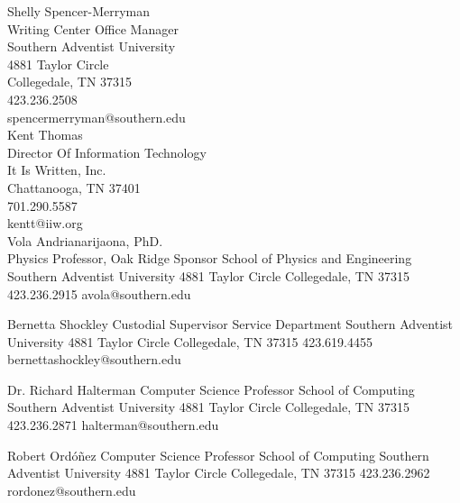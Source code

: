 
Shelly Spencer-Merryman\\
Writing Center Office Manager\\
Southern Adventist University\\
4881 Taylor Circle\\
Collegedale, TN 37315\\
423.236.2508\\
spencermerryman@southern.edu\\

Kent Thomas\\
Director Of Information Technology\\
It Is Written, Inc.\\
Chattanooga, TN 37401\\
701.290.5587\\
kentt@iiw.org\\

Vola Andrianarijaona, PhD.\\
Physics Professor, Oak Ridge Sponsor
School of Physics and Engineering
Southern Adventist University
4881 Taylor Circle
Collegedale, TN 37315
423.236.2915
avola@southern.edu

Bernetta Shockley
Custodial Supervisor
Service Department
Southern Adventist University
4881 Taylor Circle
Collegedale, TN 37315
423.619.4455
bernettashockley@southern.edu

Dr. Richard Halterman
Computer Science Professor
School of Computing
Southern Adventist University
4881 Taylor Circle
Collegedale, TN 37315
423.236.2871
halterman@southern.edu

Robert Ordóñez
Computer Science Professor
School of Computing
Southern Adventist University
4881 Taylor Circle
Collegedale, TN 37315
423.236.2962
rordonez@southern.edu
